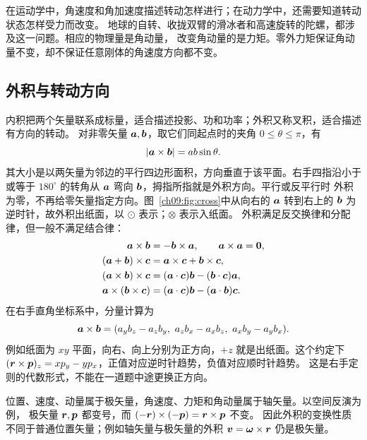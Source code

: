 {在运动学中，角速度和角加速度描述转动怎样进行；在动力学中，还需要知道转动状态怎样受力而改变。
地球的自转、收拢双臂的滑冰者和高速旋转的陀螺，都涉及这一问题。相应的物理量是角动量，
改变角动量的是力矩。零外力矩保证角动量不变，却不保证任意刚体的角速度方向都不变。

\subsection{外积与转动方向}
内积把两个矢量联系成标量，适合描述投影、功和功率；外积又称叉积，适合描述有方向的转动。
对非零矢量 $\bm{a},\bm{b}$，取它们同起点时的夹角 $0\le\theta\le\pi$，有
\begin{equation}
 |\bm{a}\times\bm{b}|=ab\sin\theta.
\end{equation}
其大小是以两矢量为邻边的平行四边形面积，方向垂直于该平面。右手四指沿小于或等于
$180^\circ$ 的转角从 $\bm{a}$ 弯向 $\bm{b}$，拇指所指就是外积方向。平行或反平行时
外积为零，不再给零矢量指定方向。图~\ref{ch09:fig:cross}中从向右的 $\bm{a}$ 转到右上的
$\bm{b}$ 为逆时针，故外积出纸面，以 $\odot$ 表示；$\otimes$ 表示入纸面。
\crossProductDiagram
外积满足反交换律和分配律，但一般不满足结合律：
\begin{align}
 \bm{a}\times\bm{b}&=-\bm{b}\times\bm{a},\qquad \bm{a}\times\bm{a}=\bm{0},\\
 (\bm{a}+\bm{b})\times\bm{c}&=\bm{a}\times\bm{c}+\bm{b}\times\bm{c},\\
 (\bm{a}\times\bm{b})\times\bm{c}&=(\bm{a}\cdot\bm{c})\bm{b}-(\bm{b}\cdot\bm{c})\bm{a},\\
 \bm{a}\times(\bm{b}\times\bm{c})&=(\bm{a}\cdot\bm{c})\bm{b}-(\bm{a}\cdot\bm{b})\bm{c}.
\end{align}
在右手直角坐标系中，分量计算为
\begin{equation}
 \bm{a}\times\bm{b}=
 (a_yb_z-a_zb_y,\ a_zb_x-a_xb_z,\ a_xb_y-a_yb_x).
\end{equation}
例如纸面为 $xy$ 平面，向右、向上分别为正方向，$+z$ 就是出纸面。这个约定下
$(\bm{r}\times\bm{p})_z=xp_y-yp_x$，正值对应逆时针趋势，负值对应顺时针趋势。
这是右手定则的代数形式，不能在一道题中途更换正方向。

位置、速度、动量属于极矢量，角速度、力矩和角动量属于轴矢量。以空间反演为例，
极矢量 $\bm{r},\bm{p}$ 都变号，而 $(-\bm{r})\times(-\bm{p})=\bm{r}\times\bm{p}$ 不变。
因此外积的变换性质不同于普通位置矢量；例如轴矢量与极矢量的外积
$\bm{v}=\bm{\omega}\times\bm{r}$ 仍是极矢量。

}
